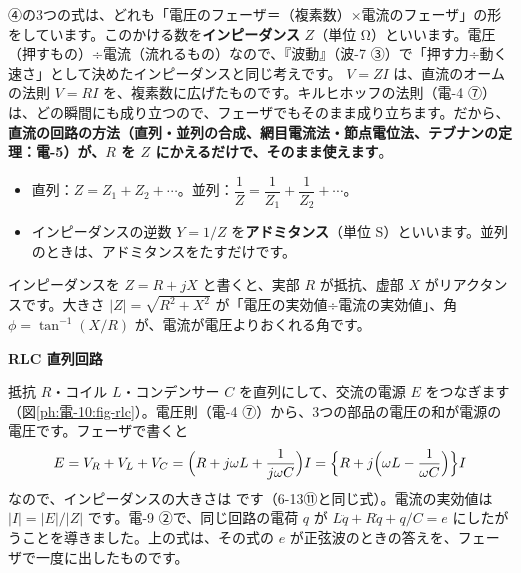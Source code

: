 \leavevmode\label{ph:電-10:sec5}④の3つの式は、どれも「電圧のフェーザ＝（複素数）×電流のフェーザ」の形をしています。このかける数を\textbf{インピーダンス} $Z$（単位 Ω）といいます。電圧（押すもの）÷電流（流れるもの）なので、『波動』（波-7 ③）で「押す力÷動く速さ」として決めたインピーダンスと同じ考えです。
\label{ph:電-10:ohm}$V=ZI$ は、直流のオームの法則 $V=RI$ を、複素数に広げたものです。キルヒホッフの法則（電-4 ⑦）は、どの瞬間にも成り立つので、フェーザでもそのまま成り立ちます。だから、\textbf{直流の回路の方法（直列・並列の合成、網目電流法・節点電位法、テブナンの定理：電-5）が、$R$ を $Z$ にかえるだけで、そのまま使えます}。
\begin{itemize}[leftmargin=1.2\zw, itemsep=2pt, topsep=2pt, label={\color{bkTheme}●}]
\item 直列：$Z=Z_1+Z_2+\cdots$。並列：$\dfrac{1}{Z}=\dfrac{1}{Z_1}+\dfrac{1}{Z_2}+\cdots$。
\item インピーダンスの逆数 $Y=1/Z$ を\textbf{アドミタンス}（単位 S）といいます。並列のときは、アドミタンスをたすだけです。
\end{itemize}
インピーダンスを $Z=R+jX$ と書くと、実部 $R$ が抵抗、虚部 $X$ がリアクタンスです。大きさ $\lvert Z\rvert=\sqrt{R^2+X^2}$ が「電圧の実効値÷電流の実効値」、角 $\phi=\tan^{-1}(X/R)$ が、電流が電圧よりおくれる角です。

\noindent\textbf{RLC 直列回路}\par\nobreak
抵抗 $R$・コイル $L$・コンデンサー $C$ を直列にして、交流の電源 $E$ をつなぎます（図\ref{ph:電-10:fig-rlc}）。電圧則（電-4 ⑦）から、3つの部品の電圧の和が電源の電圧です。フェーザで書くと
\[ E=V_R+V_L+V_C=\Bigl(R+j\omega L+\frac{1}{j\omega C}\Bigr)I=\Bigl\{R+j\Bigl(\omega L-\frac{1}{\omega C}\Bigr)\Bigr\}I \]
なので、インピーダンスの大きさは
\label{ph:電-10:A54}です（6-13⑪と同じ式）。電流の実効値は $\lvert I\rvert=\lvert E\rvert/\lvert Z\rvert$ です。電-9 ②で、同じ回路の電荷 $q$ が $L\ddot q+R\dot q+q/C=e$ にしたがうことを導きました。上の式は、その式の $e$ が正弦波のときの答えを、フェーザで一度に出したものです。

\begin{phflow}
\end{phflow}

